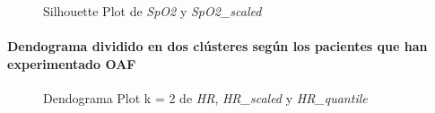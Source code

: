 \begin{figure}[ht]
    \centering
    \hfill
    \caption{Silhouette Plot de \textit{SpO2} y \textit{SpO2\_scaled}}\label{fig:acf_si_spo2}
\end{figure}

\paragraph{Dendograma dividido en dos clústeres según los pacientes que han experimentado OAF}

\begin{figure}[H]
    \centering
    \caption{Dendograma Plot k = 2 de \textit{HR}, \textit{HR\_scaled} y \textit{HR\_quantile}}\label{fig:acf_ctg_fc}
\end{figure}

